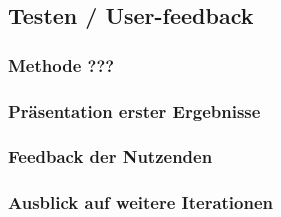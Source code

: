 \subsection{Testen / User-feedback}
\subsubsection{Methode ???}
\subsubsection{Präsentation erster Ergebnisse}
\subsubsection{Feedback der Nutzenden}
\subsubsection{Ausblick auf weitere Iterationen}